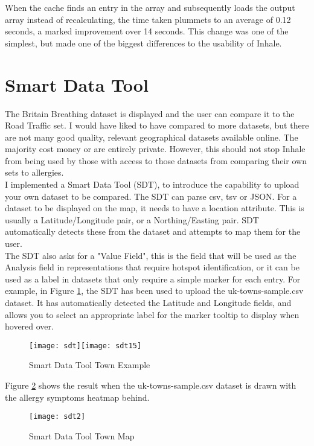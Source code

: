 When the cache finds an entry in the array and subsequently loads the output array instead of recalculating, the time taken plummets to an average of 0.12 seconds, a marked improvement over 14 seconds. This change was one of the simplest, but made one of the biggest differences to the usability of Inhale.

\section{Smart Data Tool}

The Britain Breathing dataset is displayed and the user can compare it to the Road Traffic set. I would have liked to have compared to more datasets, but there are not many good quality, relevant geographical datasets available online. The majority cost money or are entirely private. However, this should not stop Inhale from being used by those with access to those datasets from comparing their own sets to allergies.\\

I implemented a Smart Data Tool (SDT), to introduce the capability to upload your own dataset to be compared. The SDT can parse csv, tsv or JSON. For a dataset to be displayed on the map, it needs to have a location attribute. This is usually a Latitude/Longitude pair, or a Northing/Easting pair. SDT automatically detects these from the dataset and attempts to map them for the user.\\

The SDT also asks for a "Value Field", this is the field that will be used as the Analysis field in representations that require hotspot identification, or it can be used as a label in datasets that only require a simple marker for each entry. For example, in Figure \ref{fig:sdt}, the SDT has been used to upload the uk-towns-sample.csv dataset. It has automatically detected the Latitude and Longitude fields, and allows you to select an appropriate label for the marker tooltip to display when hovered over.\\

\begin{figure}[H]
\begin{center}
\texttt{[image: sdt]}\texttt{[image: sdt15]}
\caption{Smart Data Tool Town Example}
\label{fig:sdt}
\end{center}
\end{figure}

Figure \ref{fig:sdt2} shows the result when the uk-towns-sample.csv dataset is drawn with the allergy symptoms heatmap behind.

\begin{figure}[H]
\begin{center}
\texttt{[image: sdt2]}
\caption{Smart Data Tool Town Map}
\label{fig:sdt2}
\end{center}
\end{figure}